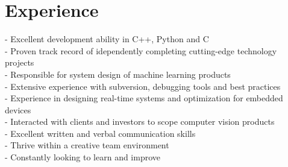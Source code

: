 \documentclass[print]{friggeri-cv} %
\begin{document}
\section{Experience}
- Excellent development ability in C++, Python and C\\
- Proven track record of idependently completing cutting-edge technology projects\\
- Responsible for system design of machine learning products\\
- Extensive experience with subversion, debugging tools and best practices\\
- Experience in designing real-time systems and optimization for embedded devices\\
- Interacted with clients and investors to scope computer vision products\\
- Excellent written and verbal communication skills\\
- Thrive within a creative team environment\\
- Constantly looking to learn and improve\\

\end{document}
